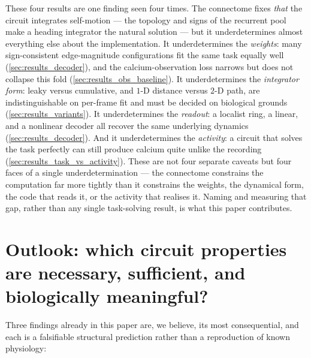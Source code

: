 \documentclass[11pt]{article}
\begin{document}
These four results are one finding seen four times. The connectome fixes
\emph{that} the circuit integrates self-motion --- the topology and signs of
the recurrent pool make a heading integrator the natural solution --- but it
underdetermines almost everything else about the implementation. It
underdetermines the \emph{weights}: many sign-consistent edge-magnitude
configurations fit the same task equally well (\cref{sec:results_decoder}), and
the calcium-observation loss narrows but does not collapse this fold
(\cref{sec:results_obs_baseline}). It underdetermines the \emph{integrator
form}: leaky versus cumulative, and $1$-D distance versus $2$-D path, are
indistinguishable on per-frame fit and must be decided on biological grounds
(\cref{sec:results_variants}). It underdetermines the \emph{readout}: a
localist ring, a linear, and a nonlinear decoder all recover the same
underlying dynamics (\cref{sec:results_decoder}). And it underdetermines the
\emph{activity}: a circuit that solves the task perfectly can still produce
calcium quite unlike the recording (\cref{sec:results_task_vs_activity}). These
are not four separate caveats but four faces of a single underdetermination ---
the connectome constrains the computation far more tightly than it constrains
the weights, the dynamical form, the code that reads it, or the activity that
realises it. Naming and measuring that gap, rather than any single
task-solving result, is what this paper contributes.

\section{Outlook: which circuit properties are necessary, sufficient,
and biologically meaningful?}
\label{sec:outlook_future}

Three findings already in this paper are, we believe, its most
consequential, and each is a falsifiable structural prediction rather than a
reproduction of known physiology:
\end{document}
